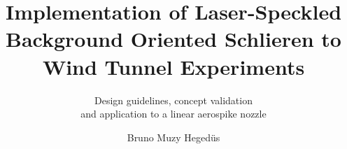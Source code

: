 \documentclass{tudelft-report}
\begin{document}
\frontmatter

\title{Implementation of Laser-Speckled Background Oriented Schlieren to Wind Tunnel Experiments}
\subtitle{Design guidelines, concept validation \\ and application to a linear aerospike nozzle}
\author{Bruno Muzy Hegedüs}

\subject{MSc Thesis - Aerospace Engineering} %

\makecover






\tableofcontents
\listoffigures
\listoftables




\mainmatter











\setcounter{biburlnumpenalty}{7000}
\setcounter{biburllcpenalty}{7000}
\setcounter{biburlucpenalty}{7000}

\printbibliography[heading=bibintoc,title=References]


\appendix








\end{document}
